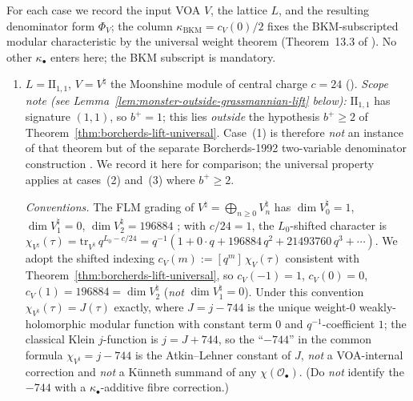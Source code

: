 \begin{remark}
\label{rem:borcherds-three-cases}
For each case we record the input VOA $V$, the lattice $L$, and the
resulting denominator form $\Phi_V$; the column $\kappa_{\mathrm{BKM}}
= c_V(0)/2$ fixes the $\mathrm{BKM}$-subscripted modular
characteristic by the universal weight theorem (Theorem~13.3 of
\cite{Borcherds1998}). No other $\kappa_{\bullet}$ enters here;
the BKM subscript is mandatory.
\begin{enumerate}[label=\textup{(\arabic*)}]
 \item $L = \mathrm{II}_{1,1}$, $V = V^\natural$ the Moonshine module of central
 charge $c = 24$ (\cite{FrenkelLepowskyMeurman1988}). \emph{Scope
 note (see Lemma~\ref{lem:monster-outside-grassmannian-lift} below):}
 $\mathrm{II}_{1,1}$ has signature $(1,1)$, so $b^+ = 1$; this lies
 \emph{outside} the hypothesis $b^+ \ge 2$ of
 Theorem~\ref{thm:borcherds-lift-universal}. Case~(1) is therefore
 \emph{not} an instance of that theorem but of the separate
 Borcherds-1992 two-variable denominator construction
 \cite[Prop.~3.1, Thm.~10.1]{Borcherds1992}. We record it here for
 comparison; the universal property applies at cases~(2) and~(3)
 where $b^+ \ge 2$.

 \emph{Conventions.} The FLM grading of $V^\natural = \bigoplus_{n
 \ge 0} V^\natural_n$ has $\dim V^\natural_0 = 1$, $\dim V^\natural_1
 = 0$, $\dim V^\natural_2 = 196884$ \cite[Chap.~10]{FrenkelLepowskyMeurman1988};
 with $c/24 = 1$, the $L_0$-shifted character is $\chi_{V^\natural}(\tau) =
 \mathrm{tr}_{V^\natural}\, q^{L_0 - c/24} = q^{-1}(1 + 0 \cdot q +
 196884\, q^2 + 21493760\, q^3 + \cdots)$. We adopt the shifted
 indexing $c_V(m) := [q^m]\,\chi_V(\tau)$ consistent with
 Theorem~\ref{thm:borcherds-lift-universal}, so $c_V(-1) = 1$,
 $c_V(0) = 0$, $c_V(1) = 196884 = \dim V^\natural_2$ (\emph{not}
 $\dim V^\natural_1 = 0$). Under this convention
 $\chi_{V^\natural}(\tau) = J(\tau)$ exactly, where $J = j - 744$ is
 the unique weight-$0$ weakly-holomorphic modular function with
 constant term $0$ and $q^{-1}$-coefficient $1$; the classical Klein
 $j$-function is $j = J + 744$, so the ``$-744$'' in the common
 formula $\chi_{V^\natural} = j - 744$ is the Atkin--Lehner constant
 of $J$, \emph{not} a VOA-internal correction and \emph{not} a
 K\"unneth summand of any $\chi(\mathcal{O}_\bullet)$. (Do
 \emph{not} identify the $-744$ with a
 $\kappa_\bullet$-additive fibre correction.)


\end{enumerate}
\end{remark}
